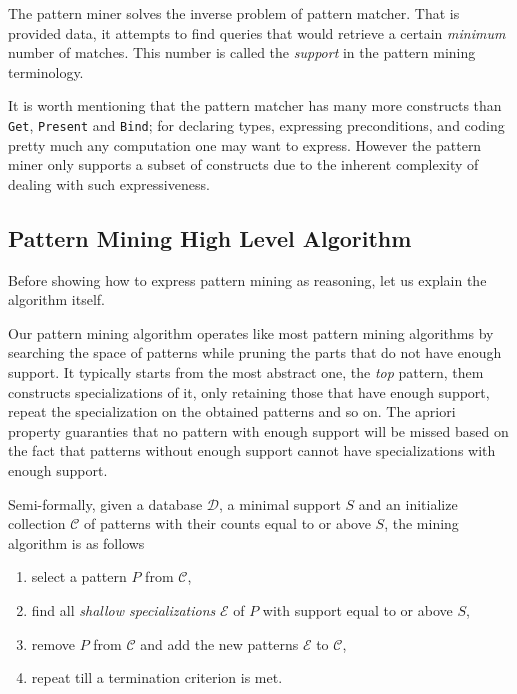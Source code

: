 \documentclass[runningheads]{llncs}
\begin{document}
The pattern miner solves the inverse problem of pattern matcher. That
is provided data, it attempts to find queries that would retrieve a
certain \emph{minimum} number of matches. This number is called the
\emph{support} in the pattern mining terminology.

It is worth mentioning that the pattern matcher has many more
constructs than \texttt{Get}, \texttt{Present} and \texttt{Bind}; for
declaring types, expressing preconditions, and coding pretty much any
computation one may want to express. However the pattern miner only
supports a subset of constructs due to the inherent complexity of
dealing with such expressiveness.

\subsection{Pattern Mining High Level Algorithm}

Before showing how to express pattern mining as reasoning, let us
explain the algorithm itself.

Our pattern mining algorithm operates like most pattern mining
algorithms \cite{Chi2005Freq} by searching the space of patterns while
pruning the parts that do not have enough support. It typically starts
from the most abstract one, the \emph{top} pattern, them constructs
specializations of it, only retaining those that have enough support,
repeat the specialization on the obtained patterns and so on. The
apriori property \cite{Agrawal1994fastalgorithms} guaranties that no
pattern with enough support will be missed based on the fact that
patterns without enough support cannot have specializations with
enough support.

Semi-formally, given a database $\mathcal{D}$, a minimal support $S$
and an initialize collection $\mathcal{C}$ of patterns with their
counts equal to or above $S$, the mining algorithm is as follows
\begin{enumerate}
\item select a pattern $P$ from $\mathcal{C}$,
\item find all \emph{shallow specializations} $\mathcal{E}$ of $P$
  with support equal to or above $S$,
\item remove $P$ from $\mathcal{C}$ and add the new patterns
  $\mathcal{E}$ to $\mathcal{C}$,
\item repeat till a termination criterion is met.
\end{enumerate}
\end{document}
